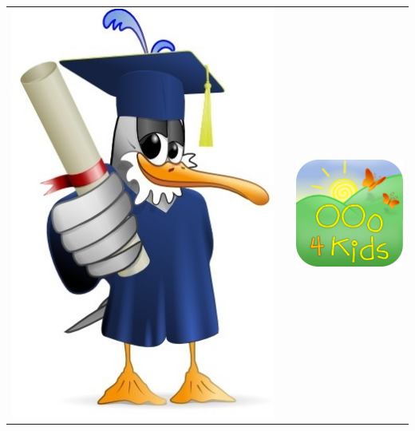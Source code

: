 \documentclass[a4paper,11pt]{article}
\begin{document}
\begin{titlepage}
\begin{center}
		\end{center}

		\vfill

		
		\begin{tabular}{l c r}
				 \includegraphics[scale=0.4]{images/logo_EducOOo.jpg}  & \hspace{6cm} & \includegraphics[scale=0.4]{images/OOo4Kids.png}  \\
		\end{tabular}
		
		
	\end{titlepage}
\end{document}
